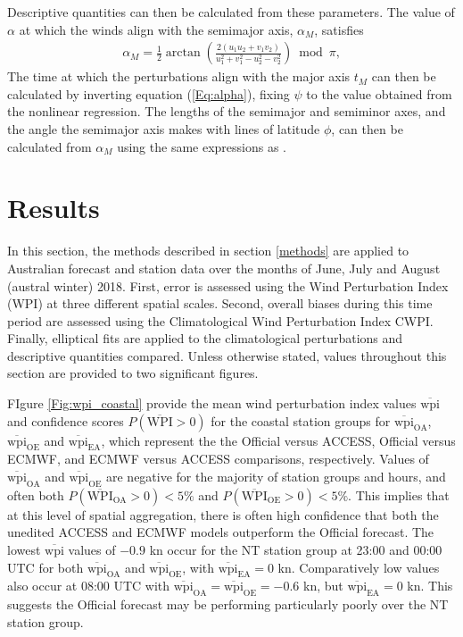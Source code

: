 \documentclass[alpha-refs]{wiley-article}
\begin{document}
Descriptive quantities can then be calculated from these parameters. The value of $\alpha$ at which the winds align with the semimajor axis, $\alpha_M$, satisfies
\begin{align}
\alpha_M = \frac{1}{2} \arctan\left(\frac{2(u_1 u_2 + v_1 v_2)}{u_1^2 + v_1^2 - u_2^2 - v_2^2} \right) \bmod \pi,
\end{align}
The time at which the perturbations align with the major axis $t_M$ can then be calculated by inverting equation (\ref{Eq:alpha}), fixing $\psi$ to the value obtained from the nonlinear regression. The lengths of the semimajor and semiminor axes, and the angle the semimajor axis makes with lines of latitude $\phi$, can then be calculated from $\alpha_M$ using the same expressions as \citet{gille05}. 

\section{Results}
\label{results}
In this section, the methods described in section \ref{methods} are applied to Australian forecast and station data over the months of June, July and August (austral winter) 2018. First, error is assessed using the Wind Perturbation Index (WPI) at three different spatial scales. Second, overall biases during this time period are assessed using the Climatological Wind Perturbation Index CWPI. Finally, elliptical fits are applied to the climatological perturbations and descriptive quantities compared. Unless otherwise stated, values throughout this section are provided to two significant figures. 

FIgure \ref{Fig:wpi_coastal} provide the mean wind perturbation index values $\overline{\text{wpi}}$ and confidence scores $P\left(\overline{\text{WPI}}>0\right)$ for the coastal station groups for $\overline{\text{wpi}}_\text{OA}$, $\overline{\text{wpi}}_\text{OE}$ and $\overline{\text{wpi}}_\text{EA}$, which represent the the Official versus ACCESS, Official versus ECMWF, and ECMWF versus ACCESS comparisons, respectively.  Values of $\overline{\text{wpi}}_\text{OA}$ and $\overline{\text{wpi}}_\text{OE}$ are negative for the majority of station groups and hours, and often both $P\left(\overline{\text{WPI}}_{\text{OA}} > 0\right) < 5\%$ and $P\left(\overline{\text{WPI}}_\text{OE} > 0\right) < 5\%$. This implies that at this level of spatial aggregation, there is often high confidence that both the unedited ACCESS and ECMWF models outperform the Official forecast. The lowest $\overline{\text{wpi}}$ values of $-0.9$ kn occur for the NT station group at 23:00 and 00:00 UTC for both $\overline{\text{wpi}}_\text{OA}$ and $\overline{\text{wpi}}_\text{OE}$, with $\overline{\text{wpi}}_\text{EA}= 0$ kn. Comparatively low values also occur at 08:00 UTC with $\overline{\text{wpi}}_\text{OA}=\overline{\text{wpi}}_\text{OE}=-0.6$ kn, but $\overline{\text{wpi}}_\text{EA}= 0$ kn. This suggests the Official forecast may be performing particularly poorly over the NT station group.
\end{document}
